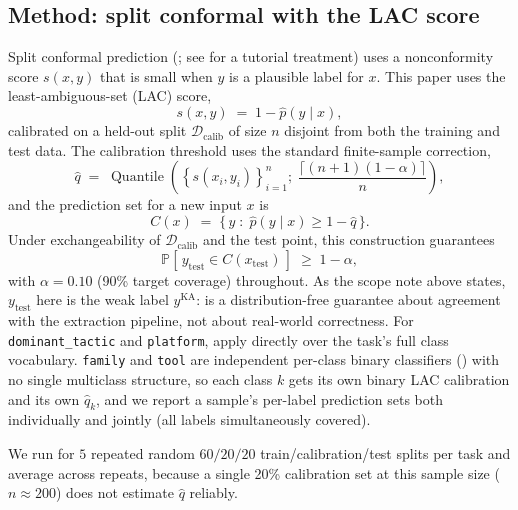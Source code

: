 \documentclass[preprint,12pt]{elsarticle}
\begin{document}
\subsection{Method: split conformal with the LAC score}
\label{sec:conformal-method}
Split conformal prediction (\citealp{vovk2005algorithmic, lei2018distribution};
see \citealp{angelopoulos2023gentle} for a tutorial treatment) uses a
nonconformity score $s(x,y)$ that is small when $y$ is a plausible label
for $x$. This paper uses the least-ambiguous-set (LAC) score,
\begin{equation}
\label{eq:lac}
s(x,y) \;=\; 1 - \hat p(y \mid x),
\end{equation}
calibrated on a held-out split $\mathcal{D}_{\mathrm{calib}}$ of size $n$
disjoint from both the training and test data. The calibration threshold
uses the standard finite-sample correction,
\begin{equation}
\label{eq:qhat}
\hat q \;=\; \operatorname{Quantile}\!\left(
  \left\{s(x_i,y_i)\right\}_{i=1}^{n} ;\;
  \frac{\lceil (n+1)(1-\alpha)\rceil}{n}\right),
\end{equation}
and the prediction set for a new input $x$ is
\begin{equation}
\label{eq:predset}
C(x) \;=\; \bigl\{\, y \;:\; \hat p(y\mid x) \geq 1-\hat q \,\bigr\}.
\end{equation}
Under exchangeability of $\mathcal{D}_{\mathrm{calib}}$ and the test
point, this construction guarantees
\begin{equation}
\label{eq:coverage}
\mathbb{P}\!\left[\, y_{\mathrm{test}} \in C(x_{\mathrm{test}}) \,\right]
  \;\geq\; 1-\alpha,
\end{equation}
with $\alpha{=}0.10$ (90\% target coverage) throughout. As the scope
note above states, $y_{\mathrm{test}}$ here is the weak label
$y^{\mathrm{KA}}$:  is a distribution-free
guarantee about agreement with the extraction pipeline, not about
real-world correctness. For \texttt{dominant\_tactic} and
\texttt{platform},  apply directly over
the task's full class vocabulary. \texttt{family} and \texttt{tool} are
independent per-class binary classifiers () with no single
multiclass structure, so each class $k$ gets its own binary LAC calibration
and its own $\hat q_k$, and we report a sample's per-label prediction sets
both individually and jointly (all labels simultaneously covered).

We run  for $5$ repeated random $60/20/20$
train/calibration/test splits per task and average across repeats, because a
single 20\% calibration set at this sample size ($n{\approx}200$) does not
estimate $\hat q$ reliably.
\end{document}
